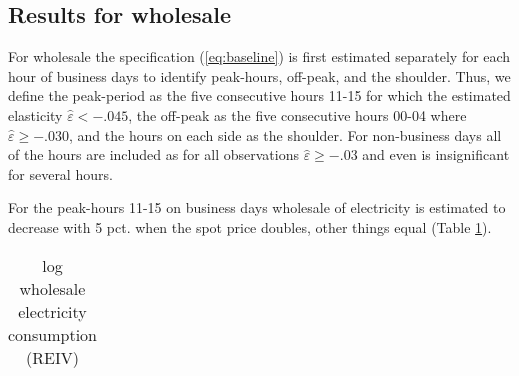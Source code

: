 \label{sec:results}
\subsection{Results for wholesale}
\label{subsec:r_wholesale}
For wholesale the specification (\ref{eq:baseline}) is first estimated separately for each hour of business days to identify peak-hours, off-peak, and the shoulder. Thus, we define the peak-period as the five consecutive hours 11-15 for which the estimated elasticity $\hat{\varepsilon}<-.045$, the off-peak as the five consecutive hours 00-04 where $\hat{\varepsilon}\geq-.030$, and the hours on each side as the shoulder. For non-business days all of the hours are included as for all observations $\hat{\varepsilon}\geq-.03$ and even is insignificant for several hours.
\par
For the peak-hours 11-15 on business days wholesale of electricity is estimated to decrease with 5 pct. when the spot price doubles, other things equal (Table \ref{tab:ws_preferred}).
\begin{table}[H]
  \vspace{-0.0cm}
  \centering
  \caption{log wholesale electricity consumption (REIV)}
  \footnotesize
    \begin{tabular}{lcccc}
      \toprule
        
    \end{tabular}
  \label{tab:ws_preferred}
  \vspace{-0.0cm}
\end{table}



